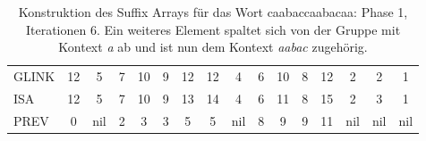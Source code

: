 \begin{table}[H]
\begin{adjustbox}{max width=\textwidth}
\begin{tabular}{lccccccccccccccc}
\multicolumn{1}{l|}{GLINK}   & 12                      & 5                         & 7                       & 10                                                 & 9                           & 12                        & 12                         & \cellcolor[HTML]{\red}4 & 6                         & 10 & 8                       & 12 & 2                         & 2                         & 1   \\
\multicolumn{1}{l|}{ISA}     & 12                      & 5                         & 7                       & 10                                                 & 9                           & 13                        & 14                         & \cellcolor[HTML]{\red}4 & 6                         & 11 & 8                       & 15 & \cellcolor[HTML]{\red}2 & \cellcolor[HTML]{\red}3 & 1   \\
\multicolumn{1}{l|}{PREV}    & 0                       & nil                       & 2                       & 3                                                  & 3                           & 5                         & 5                          & nil                       & \cellcolor[HTML]{\red}8 & 9  & 9                       & 11 & nil                       & nil                       & nil
\end{tabular}
\end{adjustbox}

\caption[Konstruktion des Suffix Arrays für das Wort caabaccaabacaa: Phase 1, Iterationen 6]{Konstruktion des Suffix Arrays für das Wort caabaccaabacaa: Phase 1, Iterationen 6. Ein weiteres Element spaltet sich von der Gruppe mit Kontext \textit{a} ab und ist nun dem Kontext \textit{aabac} zugehörig.}
\label{table_complex_example_1_6} 
\end{table}

